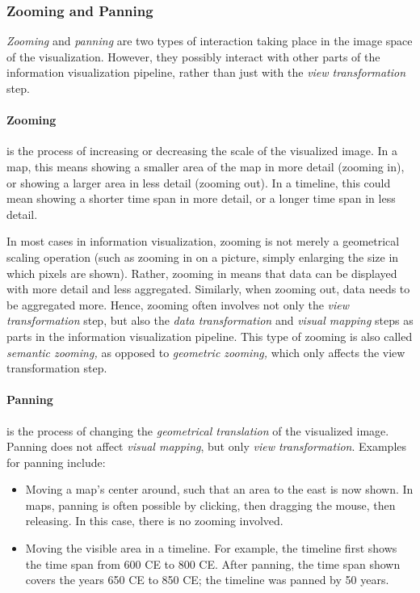 \subsubsection{Zooming and Panning}
\label{sec:terminology-zooming-panning}

\emph{Zooming} and \emph{panning} are two types of interaction taking place in the image space of the visualization.
However, they possibly interact with other parts of the information visualization pipeline, rather than just with the \emph{view transformation} step.

\paragraph{Zooming} is the process of increasing or decreasing the scale of the visualized image.
In a map, this means showing a smaller area of the map in more detail (zooming in), or showing a larger area in less detail (zooming out).
In a timeline, this could mean showing a shorter time span in more detail, or a longer time span in less detail.

In most cases in information visualization, zooming is not merely a geometrical scaling operation (such as zooming in on a picture, simply enlarging the size in which pixels are shown).
Rather, zooming in means that data can be displayed with more detail and less aggregated.
Similarly, when zooming out, data needs to be aggregated more.
Hence, zooming often involves not only the \emph{view transformation} step, but also the \emph{data transformation} and \emph{visual mapping} steps as parts in the information visualization pipeline.
This type of zooming is also called \emph{semantic zooming,}
as opposed to \emph{geometric zooming,} which only affects the view transformation step.

\paragraph{Panning} is the process of changing the \emph{geometrical translation} of the visualized image.
Panning does not affect \emph{visual mapping}, but only \emph{view transformation}.
Examples for panning include:

\begin{itemize}
  \item
    Moving a map's center around, such that an area to the east is now shown.
    In maps, panning is often possible by clicking, then dragging the mouse, then releasing.
    In this case, there is no zooming involved.
  \item
    Moving the visible area in a timeline.
    For example, the timeline first shows the time span from 600 CE to 800 CE.
    After panning, the time span shown covers the years 650 CE to 850 CE;
    the timeline was panned by 50 years.
\end{itemize}

